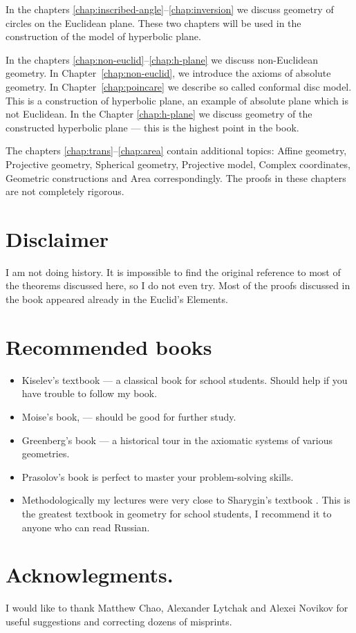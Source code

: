 \medskip

In the chapters \ref{chap:inscribed-angle}--\ref{chap:inversion} we discuss geometry of circles on the Euclidean plane. 
These two chapters 
will be used in the construction of the model of hyperbolic plane.

In the chapters \ref{chap:non-euclid}--\ref{chap:h-plane}
we discuss non-Euclidean geometry.
In Chapter~\ref{chap:non-euclid},
we introduce the axioms of absolute geometry.
In Chapter~\ref{chap:poincare}
we describe so called conformal disc model.
This is a construction of hyperbolic plane,
an example of absolute plane which is not Euclidean.
In the Chapter \ref{chap:h-plane} we discuss geometry of the constructed hyperbolic plane --- this is the highest point in the book.

The chapters \ref{chap:trans}--\ref{chap:area} contain additional topics:
Affine geometry,
Projective geometry,
Spherical geometry, 
Projective model,
Complex coordinates,
Geometric constructions
and Area correspondingly.
The proofs in these chapters are not completely rigorous.


\section*{Disclaimer}

I am not doing history.
It is  impossible to find the original reference to most of the theorems discussed here, so I do not even try.
Most of the proofs discussed in the book 
appeared already in the Euclid's Elements.

\section*{Recommended books}

\begin{itemize}
\item Kiselev's textbook \cite{kiselev} ---
a classical book for school students.
Should help if you have trouble to follow my book.

\item Moise's book, \cite{moise} ---
should be good for further study.

\item Greenberg's book \cite{greenberg}  --- a historical tour in the axiomatic systems of various geometries.

\item Prasolov's book \cite{prasolov} is perfect to master your problem-solving skills. 

\item Methodologically my lectures
were very close to Sharygin's  textbook \cite{sharygin}.
This is the greatest textbook in geometry for school students,
I recommend it to anyone who can read Russian.


\end{itemize}

\section*{Acknowlegments.}
I would like to thank  
Matthew Chao, 
Alexander Lytchak
and Alexei Novikov
for useful suggestions and correcting dozens of misprints.





